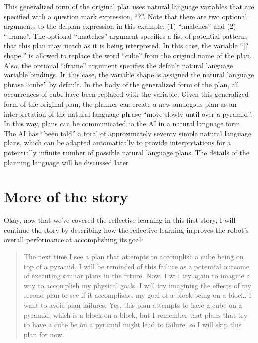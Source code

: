 This generalized form of the original plan uses natural language
variables that are specified with a question mark expression, ``?''.
Note that there are two optional arguments to the defplan expression
in this example: (1) ``:matches'' and (2) ``:frame''.  The optional
``:matches'' argument specifies a list of potential patterns that this
plan may match as it is being interpreted.  In this case, the variable
``[? shape]'' is allowed to replace the word ``cube'' from the
original name of the plan.  Also, the optional ``:frame'' argument
specifies the default natural language variable bindings.  In this
case, the variable shape is assigned the natural language phrase
``cube'' by default.  In the body of the generalized form of the plan,
all occurrences of cube have been replaced with the variable.  Given
this generalized form of the original plan, the planner can create a
new analogous plan as an interpretation of the natural language phrase
``move slowly until over a pyramid''.  In this way, plans can be
communicated to the AI in a natural language form.  The AI has ``been
told'' a total of approximately seventy simple natural language plans,
which can be adapted automatically to provide interpretations for a
potentially infinite number of possible natural language plans.  The
details of the planning language will be discussed later.

\section{More of the story}

Okay, now that we've covered the reflective learning in this first
story, I will continue the story by describing how the reflective
learning improves the robot's overall performance at accomplishing its
goal:
\begin{quote}
  The next time I see a plan that attempts to accomplish a cube being
  on top of a pyramid, I will be reminded of this failure as a
  potential outcome of executing similar plans in the future.  Now, I
  will try again to imagine a way to accomplish my physical goals.  I
  will try imagining the effects of my second plan to see if it
  accomplishes my goal of a block being on a block.  I want to avoid
  plan failures.  Yes, this plan attempts to have a cube on a pyramid,
  which is a block on a block, but I remember that plans that try to
  have a cube be on a pyramid might lead to failure, so I will skip
  this plan for now.
\end{quote}


